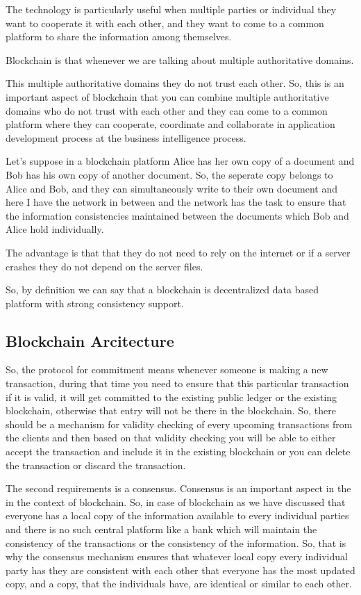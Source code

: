 The technology is particularly useful when multiple parties or individual they want to cooperate it with each other, and they want to come to a common platform to share the information among themselves.

Blockchain is that whenever we are talking about multiple authoritative domains.

This multiple authoritative domains they do not trust each other. So, this is an important aspect of blockchain that you can combine multiple authoritative domains who do not trust with each other and they can come to a common platform where they can cooperate, coordinate and collaborate in application development process at the business intelligence process.

Let's suppose in a blockchain platform Alice has her own copy of a document and Bob has his own copy of another document. So, the seperate copy belongs to Alice and Bob, and they can simultaneously write to their own document and here I have the network in between and the network has the task to ensure that the information consistencies maintained between the documents which Bob and Alice hold individually.

The advantage  is that that they do not need to rely on the internet or if a server crashes they do not depend on the server files.

So, by definition we can say that a blockchain is decentralized data based platform with strong consistency support.

\subsection{Blockchain Arcitecture}
So, the protocol for commitment means whenever someone is making a new transaction, during that time you need to ensure that this particular transaction if it is valid, it will get committed to the existing public ledger or the existing blockchain, otherwise that entry will not be there in the blockchain. So, there should be a mechanism for validity checking of every upcoming transactions from the clients and then based on that validity checking you will be able to either accept the transaction and include it in the existing blockchain or you can delete the transaction or discard the transaction.

The second requirements is a consensus. Consensus is an important aspect in the in the context of blockchain. So, in case of blockchain as we have discussed that everyone has a 
local copy of the information available to every individual parties and there is no such central platform like a bank which will maintain the consistency of the transactions or 
the consistency of the information. So, that is why the consensus mechanism ensures that whatever local copy every individual party has they are consistent with each other that 
everyone has the most updated copy, and a copy, that the individuals have, are identical or similar to each other. 


